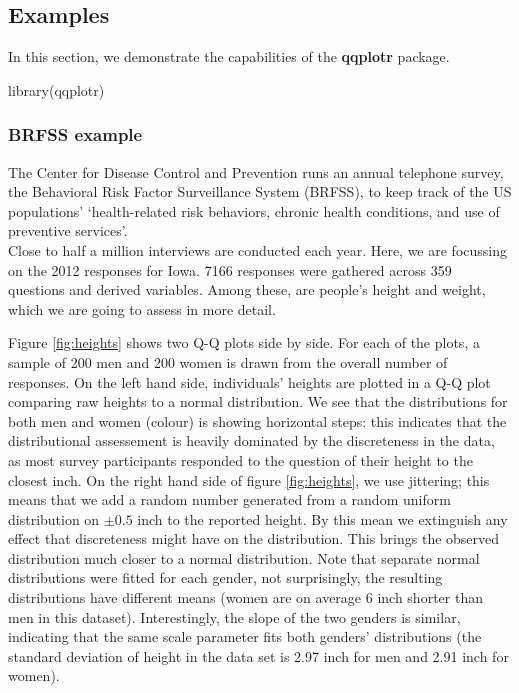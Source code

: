 \subsection{Examples}\label{examples}

\label{sec:examples}

In this section, we demonstrate the capabilities of the \textbf{qqplotr}
package.

\begin{Schunk}
\begin{Sinput}
library(qqplotr)
\end{Sinput}
\end{Schunk}

\subsubsection{BRFSS example}\label{brfss-example}

The Center for Disease Control and Prevention runs an annual telephone
survey, the Behavioral Risk Factor Surveillance System (BRFSS), to keep
track of the US populations' `health-related risk behaviors, chronic
health conditions, and use of preventive services'.\\
Close to half a million interviews are conducted each year. Here, we are
focussing on the 2012 responses for Iowa. 7166 responses were gathered
across 359 questions and derived variables. Among these, are people's
height and weight, which we are going to assess in more detail.

Figure \ref{fig:heights} shows two Q-Q plots side by side. For each of
the plots, a sample of 200 men and 200 women is drawn from the overall
number of responses. On the left hand side, individuals' heights are
plotted in a Q-Q plot comparing raw heights to a normal distribution. We
see that the distributions for both men and women (colour) is showing
horizontal steps: this indicates that the distributional assessement is
heavily dominated by the discreteness in the data, as most survey
participants responded to the question of their height to the closest
inch. On the right hand side of figure \ref{fig:heights}, we use
jittering; this means that we add a random number generated from a
random uniform distribution on \(\pm 0.5\) inch to the reported height.
By this mean we extinguish any effect that discreteness might have on
the distribution. This brings the observed distribution much closer to a
normal distribution. Note that separate normal distributions were fitted
for each gender, not surprisingly, the resulting distributions have
different means (women are on average 6 inch shorter than men in this
dataset). Interestingly, the slope of the two genders is similar,
indicating that the same scale parameter fits both genders'
distributions (the standard deviation of height in the data set is 2.97
inch for men and 2.91 inch for women).

